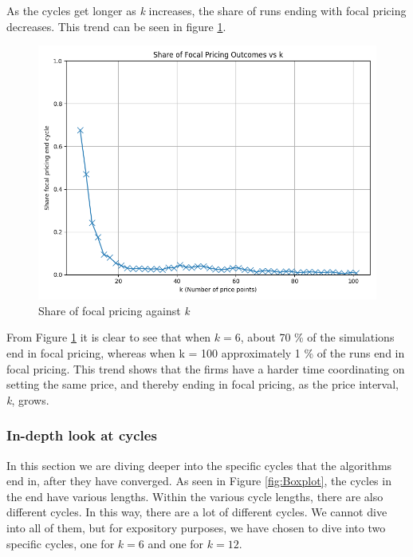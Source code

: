 \documentclass{article}
\begin{document}
As the cycles get longer as \textit{k} increases, the share of runs ending with focal pricing decreases. This trend can be seen in figure \ref{fig:ShareFocalPricing}. 
\begin{figure}[H]
    \centering
    \includegraphics[scale = 0.5]{ShareFocal1000NumRuns.png}
    \caption{Share of focal pricing against \textit{k}}
    \label{fig:ShareFocalPricing}
\end{figure}
From Figure \ref{fig:ShareFocalPricing} it is clear to see that when $k = 6$, about 70 \% of the simulations end in focal pricing, whereas when k = 100 approximately 1 \% of the runs end in focal pricing. This trend shows that the firms have a harder time coordinating on setting the same price, and thereby ending in focal pricing, as the price interval, \textit{k}, grows.


\subsubsection{In-depth look at cycles}
\label{In-depth look at cycles}
In this section we are diving deeper into the specific cycles that the algorithms end in, after they have converged. As seen in Figure \ref{fig:Boxplot}, the cycles in the end have various lengths. Within the various cycle lengths, there are also different cycles. In this way, there are a lot of different cycles. We cannot dive into all of them, but for expository purposes, we have chosen to dive into two specific cycles, one for $k=6$ and one for $k=12$. 
\end{document}
